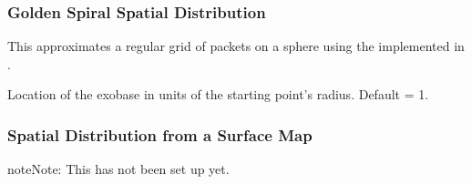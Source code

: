 \documentclass[letterpaper,10pt,english]{sphinxmanual}
\begin{document}
\subsubsection{Golden Spiral Spatial Distribution}
\label{\detokenize{nexoclom2/inputfiles:golden-spiral-spatial-distribution}}\label{\detokenize{nexoclom2/inputfiles:goldenspiralspatdist}}
\sphinxAtStartPar
This approximates a regular grid of packets on a sphere using the
 implemented in .
\begin{description}
\sphinxAtStartPar
Location of the exobase in units of the starting point’s radius.
Default = 1.

\end{description}


\subsubsection{Spatial Distribution from a Surface Map}
\label{\detokenize{nexoclom2/inputfiles:spatial-distribution-from-a-surface-map}}\label{\detokenize{nexoclom2/inputfiles:surfacemapspatdist}}
\begin{sphinxadmonition}{note}{Note:}
\sphinxAtStartPar
This has not been set up yet.
\end{sphinxadmonition}
\end{document}
